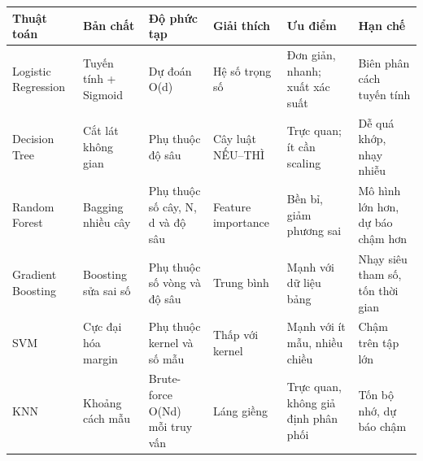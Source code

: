 {\def\LTcaptype{none} %
\begin{longtable}[]{@{}
  >{\raggedright\arraybackslash}p{}
  >{\centering\arraybackslash}p{}
  >{\centering\arraybackslash}p{}
  >{\centering\arraybackslash}p{}
  >{\raggedright\arraybackslash}p{}
  >{\centering\arraybackslash}p{}@{}}
\toprule\noalign{}
\begin{minipage}[b]{\linewidth}\raggedright
\textbf{Thuật toán}
\end{minipage} & \begin{minipage}[b]{\linewidth}\centering
\textbf{Bản chất}
\end{minipage} & \begin{minipage}[b]{\linewidth}\centering
\textbf{Độ phức tạp}
\end{minipage} & \begin{minipage}[b]{\linewidth}\centering
\textbf{Giải thích}
\end{minipage} & \begin{minipage}[b]{\linewidth}\centering
\textbf{Ưu điểm}
\end{minipage} & \begin{minipage}[b]{\linewidth}\centering
\textbf{Hạn chế}
\end{minipage} \\
\midrule\noalign{}
\endhead
\bottomrule\noalign{}
\endlastfoot
Logistic Regression & Tuyến tính + Sigmoid & Dự đoán O(d) & Hệ số trọng
số & Đơn giản, nhanh; xuất xác suất & Biên phân cách tuyến tính \\
Decision Tree & Cắt lát không gian & Phụ thuộc độ sâu & Cây luật
NẾU--THÌ & Trực quan; ít cần scaling & Dễ quá khớp, nhạy nhiễu \\
Random Forest & Bagging nhiều cây & Phụ thuộc số cây, N, d và độ sâu &
Feature importance & Bền bỉ, giảm phương sai & Mô hình lớn hơn, dự báo
chậm hơn \\
Gradient Boosting & Boosting sửa sai số & Phụ thuộc số vòng và độ sâu &
Trung bình & Mạnh với dữ liệu bảng & Nhạy siêu tham số, tốn thời gian \\
SVM & Cực đại hóa margin & Phụ thuộc kernel và số mẫu & Thấp với kernel
& Mạnh với ít mẫu, nhiều chiều & Chậm trên tập lớn \\
KNN & Khoảng cách mẫu & Brute-force O(Nd) mỗi truy vấn & Láng giềng &
Trực quan, không giả định phân phối & Tốn bộ nhớ, dự báo chậm \\
\end{longtable}
}

